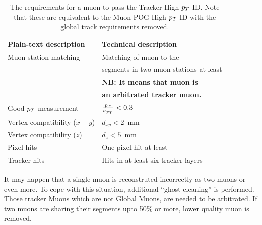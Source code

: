 \begin{table}[h]
    \begin{small}
    \begin{center}
    \caption{
      The requirements for a muon to pass the Tracker High-$p_T$ ID. Note that
      these are equivalent to the Muon POG High-$p_T$ ID with the global track 
      requirements removed.
      }
    \begin{tabular}{|l|l|}
      \hline
      Plain-text description         & Technical description                 \\
      \hline
      Muon station matching          & Matching of muon to the   \\
                                     & segments in two muon stations at least \\
                                     & \textbf{NB: It means that muon is} \\
                                     & \textbf{an arbitrated tracker muon.}  \\
      \hline                                                          
      Good $p_T$ measurement         & $\frac{p_T}{\sigma_{p_T}} < 0.3$      \\
      \hline
      Vertex compatibility ($x-y$)   & $d_{xy} < 2$~mm                       \\
      \hline
      Vertex compatibility ($z$)     & $d_{z} < 5$~mm                        \\
      \hline
      Pixel hits                     & One pixel hit at least               \\
      \hline
      Tracker hits                   & Hits in at least six tracker layers   \\
      \hline
    \end{tabular}
    \label{tab:highPtID}
    \end{center}
    \end{small}
\end{table}

It may happen that a single muon is reconstruted incorrectly as two muons or even more. To cope with this situation, additional ``ghost-cleaning'' is performed.  Those tracker Muons which are not Global Muons, are needed to be arbitrated. If two muons are sharing their segments upto 50\% or more, lower quality muon is removed.


